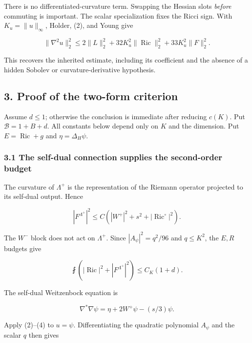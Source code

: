 \documentclass[
  10pt,
]{article}
\begin{document}
There is no differentiated-curvature term. Swapping the Hessian slots
\emph{before} commuting is important. The scalar specialization fixes
the Ricci sign. With \(K_u=\|u\|_\infty\), Holder, (2), and Young give

\[
 \|\nabla^2u\|_2^2\le
 2\|L\|_2^2+32K_u^2\|\operatorname{Ric}\|_2^2
                         +33K_u^2\|F\|_2^2.              \tag{4}
\]

This recovers the inherited estimate, including its coefficient and the
absence of a hidden Sobolev or curvature-derivative hypothesis.

\hypertarget{proof-of-the-two-form-criterion}{%
\subsection{3. Proof of the two-form
criterion}\label{proof-of-the-two-form-criterion}}

Assume \(d\le1\); otherwise the conclusion is immediate after reducing
\(c(K)\). Put \(\mathcal B=1+B+d\). All constants below depend only on
\(K\) and the dimension. Put \(E=\operatorname{Ric}+g\) and
\(\eta=\Delta_H\psi\).

\hypertarget{the-self-dual-connection-supplies-the-second-order-budget}{%
\subsubsection{3.1 The self-dual connection supplies the second-order
budget}\label{the-self-dual-connection-supplies-the-second-order-budget}}

The curvature of \(\Lambda^+\) is the representation of the Riemann
operator projected to its self-dual output. Hence

\[
 |F^{\Lambda^+}|^2\le C\left(|W^+|^2+s^2+
                               |\operatorname{Ric}^{\circ}|^2\right).
                                                               \tag{5}
\]

The \(W^-\) block does not act on \(\Lambda^+\). Since
\(|A_\psi|^2=q^2/96\) and \(q\le K^2\), the \(E,R\) budgets give

\[
 \fint\left(|\operatorname{Ric}|^2+|F^{\Lambda^+}|^2\right)
 \le C_K(1+d).
\]

The self-dual Weitzenbock equation is

\[
 \nabla^*\nabla\psi=\eta+2W^+\psi-(s/3)\psi.
\]

Apply (2)--(4) to \(u=\psi\). Differentiating the quadratic polynomial
\(A_\psi\) and the scalar \(q\) then gives
\end{document}
